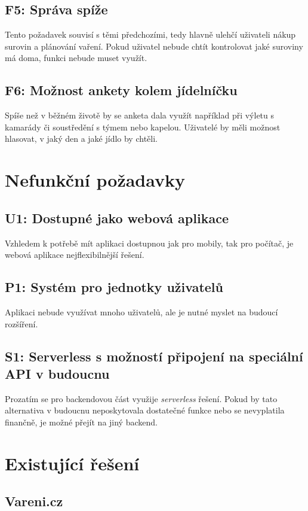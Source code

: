 \subsection{F5: Správa spíže}
Tento požadavek souvisí s těmi předchozími, tedy hlavně ulehčí uživateli nákup surovin a plánování vaření. Pokud uživatel nebude chtít
kontrolovat jaké suroviny má doma, funkci nebude muset využít.
\subsection{F6: Možnost ankety kolem jídelníčku}
Spíše než v běžném životě by se anketa dala využít například při výletu s kamarády či soustředění s týmem nebo kapelou. Uživatelé
by měli možnost hlasovat, v jaký den a jaké jídlo by chtěli.

\section{Nefunkční požadavky}

\subsection{U1: Dostupné jako webová aplikace}
Vzhledem k potřebě mít aplikaci dostupnou jak pro mobily, tak pro počítač, je webová aplikace nejflexibilnější řešení.
\subsection{P1: Systém pro jednotky uživatelů}
Aplikaci nebude využívat mnoho uživatelů, ale je nutné myslet na budoucí rozšíření.
\subsection{S1: Serverless s možností připojení na speciální API v budoucnu}
Prozatím se pro backendovou část využije \emph{serverless} řešení. Pokud by tato alternativa v budoucnu neposkytovala dostatečné
funkce nebo se nevyplatila finančně, je možné přejít na jiný backend.

\section{Existující řešení}

\subsection{Vareni.cz}

